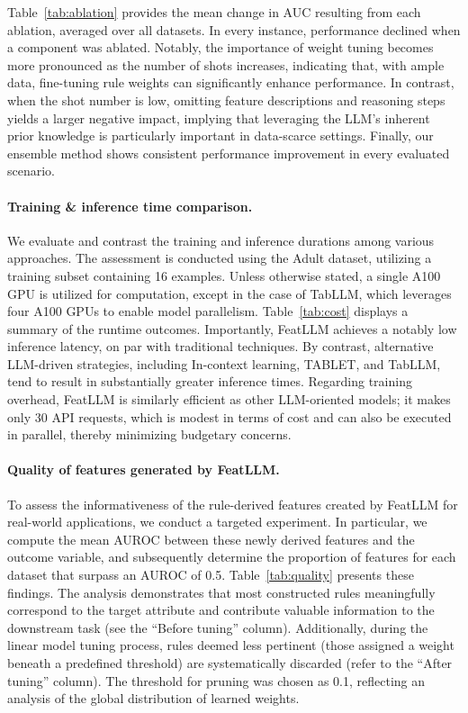 Table~\ref{tab:ablation} provides the mean change in AUC resulting from each ablation, averaged over all datasets. In every instance, performance declined when a component was ablated. Notably, the importance of weight tuning becomes more pronounced as the number of shots increases, indicating that, with ample data, fine-tuning rule weights can significantly enhance performance. In contrast, when the shot number is low, omitting feature descriptions and reasoning steps yields a larger negative impact, implying that leveraging the LLM’s inherent prior knowledge is particularly important in data-scarce settings. Finally, our ensemble method shows consistent performance improvement in every evaluated scenario.

\vspace*{-0.12in}
\paragraph{Training \& inference time comparison.} 
We evaluate and contrast the training and inference durations among various approaches. The assessment is conducted using the Adult dataset, utilizing a training subset containing 16 examples. Unless otherwise stated, a single A100 GPU is utilized for computation, except in the case of TabLLM, which leverages four A100 GPUs to enable model parallelism. Table~\ref{tab:cost} displays a summary of the runtime outcomes. Importantly, \textsf{FeatLLM} achieves a notably low inference latency, on par with traditional techniques. By contrast, alternative LLM-driven strategies, including In-context learning, TABLET, and TabLLM, tend to result in substantially greater inference times. Regarding training overhead, \textsf{FeatLLM} is similarly efficient as other LLM-oriented models; it makes only 30 API requests, which is modest in terms of cost and can also be executed in parallel, thereby minimizing budgetary concerns.

\vspace*{-0.12in}
\paragraph{Quality of features generated by \textsf{FeatLLM}.} 
To assess the informativeness of the rule-derived features created by \textsf{FeatLLM} for real-world applications, we conduct a targeted experiment. In particular, we compute the mean AUROC between these newly derived features and the outcome variable, and subsequently determine the proportion of features for each dataset that surpass an AUROC of 0.5. 
Table~\ref{tab:quality} presents these findings. The analysis demonstrates that most constructed rules meaningfully correspond to the target attribute and contribute valuable information to the downstream task (see the ``Before tuning'' column). Additionally, during the linear model tuning process, rules deemed less pertinent (those assigned a weight beneath a predefined threshold) are systematically discarded (refer to the ``After tuning'' column). The threshold for pruning was chosen as 0.1, reflecting an analysis of the global distribution of learned weights.

